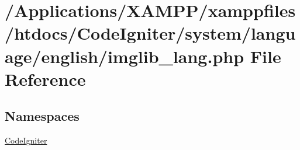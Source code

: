 \hypertarget{imglib__lang_8php}{}\section{/\+Applications/\+X\+A\+M\+P\+P/xamppfiles/htdocs/\+Code\+Igniter/system/language/english/imglib\+\_\+lang.php File Reference}
\label{imglib__lang_8php}
\subsection*{Namespaces}
\begin{DoxyCompactItemize}
\item 
 \mbox{\hyperlink{namespace_code_igniter}{Code\+Igniter}}
\end{DoxyCompactItemize}
